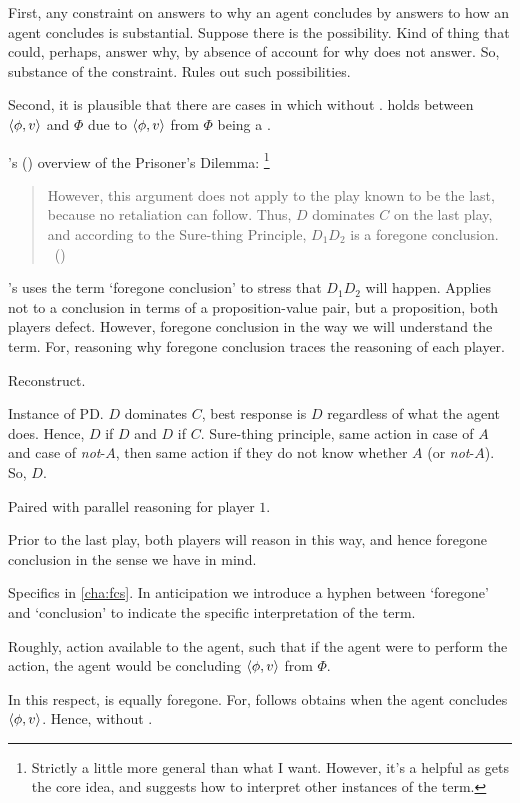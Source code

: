 \begin{note}
  First, any constraint on answers to why an agent concludes by answers to how an agent concludes is substantial.
  Suppose there is the possibility.
  Kind of thing that could, perhaps, answer why, by absence of  account for why does not answer.
  So, substance of the constraint.
  Rules out such possibilities.
\end{note}

\begin{note}
  Second, it is plausible that there are cases in which \ros{} without .
  \ros{} holds between \(\langle \phi, v \rangle\) and \(\Phi\) due to \(\langle \phi, v \rangle\) from \(\Phi\) being a \emph{}.

  \citeauthor{Rapoport:1989ww}'s (\citeyear{Rapoport:1989ww}) overview of the Prisoner's Dilemma:%
  \footnote{
    Strictly a little more general than what I want.
    However, it's a helpful  as gets the core idea, and suggests how to interpret other instances of the term.
  }

  \begin{quote}
    However, this argument does not apply to the play known to be the last, because no retaliation can follow.
    Thus, \(D\) dominates \(C\) on the last play, and according to the Sure-thing Principle, \(D_{1}D_{2}\) is a foregone conclusion.%
    \mbox{ }\hfill\mbox{(\citeyear[202]{Rapoport:1989ww})}
  \end{quote}

  \citeauthor{Rapoport:1989ww}'s uses the term `foregone conclusion' to stress that \(D_{1}D_{2}\) will happen.
  Applies not to a conclusion in terms of a proposition-value pair, but a proposition, both players defect.
  However, foregone conclusion in the way we will understand the term.
  For, reasoning why foregone conclusion traces the reasoning of each player.

  Reconstruct.

  Instance of PD.
  \(D\) dominates \(C\), best response is \(D\) regardless of what the agent does.
  Hence, \(D\) if \(D\) and \(D\) if \(C\).
  Sure-thing principle, same action in case of \(A\) and case of \emph{not}-\(A\), then same action if they do not know whether \(A\) (or \emph{not}-\(A\)).
  So, \(D\).

  Paired with parallel reasoning for player \(1\).

  Prior to the last play, both players will reason in this way, and hence foregone conclusion in the sense we have in mind.

  Specifics in \autoref{cha:fcs}.
  In anticipation we introduce a hyphen between `foregone' and `conclusion' to indicate the specific interpretation of the term.

  Roughly, action available to the agent, such that if the agent were to perform the action, the agent would be concluding \(\langle \phi, v \rangle\) from \(\Phi\).

  In this respect, \ros{} is equally foregone.
  For, \ros{} follows obtains when the agent concludes \(\langle \phi, v \rangle\).
  Hence, \ros{} without .
\end{note}


